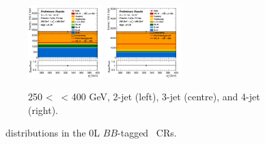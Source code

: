 \begin{figure}[h!]
\begin{subfigure}[b]{\textwidth}
        \includegraphics[width=0.32\textwidth]{Images/VH/Own_fit/postfit_VHbb/Region_distpTV_BMax400_BMin250_DCRHigh_J3_TTypebb_T2_L0_Y6051_GlobalFit_conditionnal_mu1.png}
        \includegraphics[width=0.32\textwidth]{Images/VH/Own_fit/postfit_VHbb/Region_distpTV_BMax400_BMin250_DCRHigh_J4_TTypebb_T2_L0_Y6051_GlobalFit_conditionnal_mu1.png}
        \caption{250 < \ptv\ < 400 GeV, 2-jet (left), 3-jet (centre), and 4-jet (right).}
        \label{fig:plots_VHbb_OL_250_CRH}
    \end{subfigure}
    \caption{\ptv\ distributions in the 0L $BB$-tagged \highdr\ CRs.}
    \label{fig:plots_VHbb_OL_CRH}
\end{figure} 

\vspace*{\fill} 

